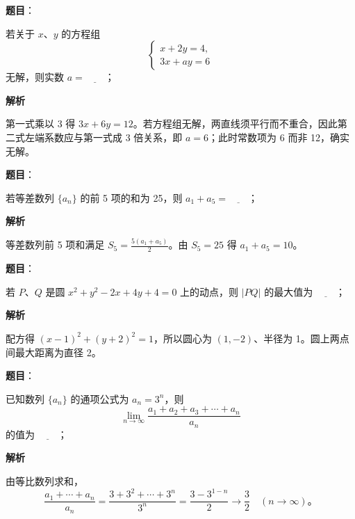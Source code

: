 \begin{answer}

\textbf{题目}：

若关于 $x\text{、}y$ 的方程组
\nopagebreak[4]
\[
\begin{cases}
x+2y=4,\\
3x+ay=6
\end{cases}
\]
无解，则实数 $a=\underline{\qquad}$；

\textbf{解析}

第一式乘以 3 得 $3x+6y=12$。若方程组无解，两直线须平行而不重合，因此第二式左端系数应与第一式成 3 倍关系，即 $a=6$；此时常数项为 6 而非 12，确实无解。


\end{answer}
\begin{answer}

\textbf{题目}：

若等差数列 $\{a_n\}$ 的前 5 项的和为 25，则 $a_1+a_5=\underline{\qquad}$；

\textbf{解析}

等差数列前 5 项和满足 $S_5=\frac{5(a_1+a_5)}2$。由 $S_5=25$ 得 $a_1+a_5=10$。


\end{answer}
\begin{answer}

\textbf{题目}：

若 $P\text{、}Q$ 是圆 $x^2+y^2-2x+4y+4=0$ 上的动点，则 $|PQ|$ 的最大值为 $\underline{\qquad}$；

\textbf{解析}

配方得 $(x-1)^2+(y+2)^2=1$，所以圆心为 $(1,-2)$、半径为 1。圆上两点间最大距离为直径 2。


\end{answer}
\begin{answer}

\textbf{题目}：

已知数列 $\{a_n\}$ 的通项公式为 $a_n=3^n$，则
\nopagebreak[4]
\[
\lim_{n\to\infty}\frac{a_1+a_2+a_3+\cdots+a_n}{a_n}
\]
的值为 $\underline{\qquad}$；

\textbf{解析}

由等比数列求和，
\nopagebreak[4]
\[
\frac{a_1+\cdots+a_n}{a_n}
=\frac{3+3^2+\cdots+3^n}{3^n}
=\frac{3-3^{1-n}}2\longrightarrow\frac32\quad(n\to\infty)\text{。}
\]


\end{answer}
